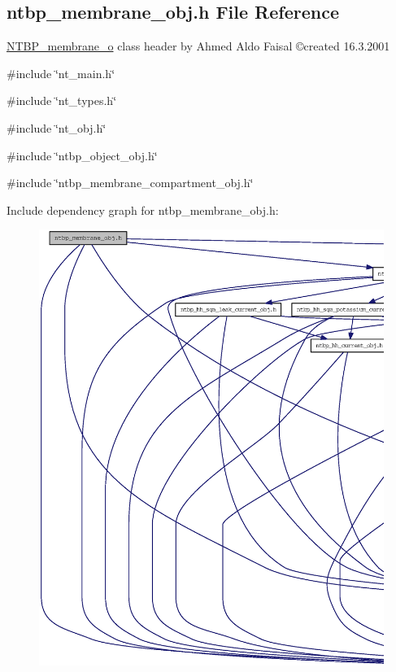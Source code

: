 \subsection{ntbp\_\-membrane\_\-obj.h File Reference}
\label{ntbp__membrane__obj_8h}



\begin{DoxyItemize}
\item \hyperlink{class_n_t_b_p__membrane__o}{NTBP\_\-membrane\_\-o} class header by Ahmed Aldo Faisal \copyright created 16.3.2001 
\end{DoxyItemize} 


{\ttfamily \#include \char`\"{}nt\_\-main.h\char`\"{}}\par
{\ttfamily \#include \char`\"{}nt\_\-types.h\char`\"{}}\par
{\ttfamily \#include \char`\"{}nt\_\-obj.h\char`\"{}}\par
{\ttfamily \#include \char`\"{}ntbp\_\-object\_\-obj.h\char`\"{}}\par
{\ttfamily \#include \char`\"{}ntbp\_\-membrane\_\-compartment\_\-obj.h\char`\"{}}\par
Include dependency graph for ntbp\_\-membrane\_\-obj.h:
\nopagebreak
\begin{figure}[H]
\begin{center}
\leavevmode
\includegraphics[width=400pt]{ntbp__membrane__obj_8h__incl}
\end{center}
\end{figure}
